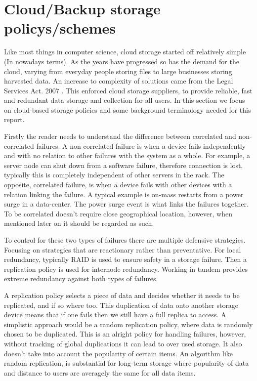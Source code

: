 \documentclass{UoYCSproject}
\begin{document}
\section{Cloud/Backup storage policys/schemes}
\label{sec:Cloud}

Like most things in computer science, cloud storage started off relatively simple (In nowadays terms).
As the years have progressed so has the demand for the cloud, varying from everyday people storing files to large businesses storing harvested data.
An increase to complexity of solutions came from the Legal Services Act. 2007 \cite{LSA}.
This enforced cloud storage suppliers, to provide reliable, fast and redundant data storage and collection for all users.
In this section we focus on cloud-based storage policies and some background terminology needed for this report.

Firstly the reader needs to understand the difference between correlated and non-correlated failures.
A non-correlated failure is when a device fails independently and with no relation to other failures with the system as a whole.
For example, a server node can shut down from a software failure, therefore connection is lost, typically this is completely independent of other servers in the rack.
The opposite, correlated failure, is when a device fails with other devices with a relation linking the failure.
A typical example is on-mass restarts from a power surge in a data-center.
The power surge event is what links the failures together.
To be correlated doesn't require close geographical location, however, when mentioned later on it should be regarded as such.

To control for these two types of failures there are multiple defensive strategies.
Focusing on strategies that are reactionary rather than preventative.
For local redundancy, typically RAID is used to ensure safety in a storage failure.
Then a replication policy \cite{Avalability storage} is used for internode redundancy.
Working in tandem provides extreme redundancy against both types of failures.

A replication policy selects a piece of data and decides whether it needs to be replicated, and if so where too. 
This duplication of data onto another storage device means that if one fails then we still have a full replica to access. 
A simplistic approach would be a random replication policy, where data is randomly chosen to be duplicated.
This is an alright policy for handling failures, however, without tracking of global duplications it can lead to over used storage.
It also doesn’t take into account the popularity of certain items.
An algorithm like random replication, is substantial for long-term storage where popularity of data and distance to users are averagely the same for all data items.
\end{document}
